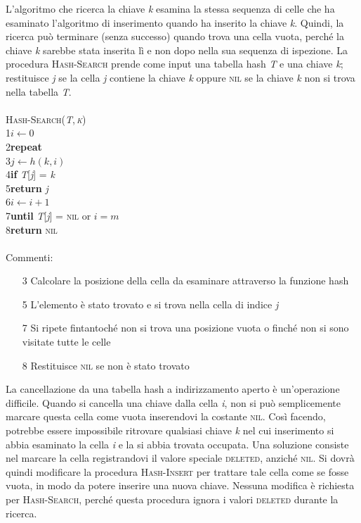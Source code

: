 \documentclass[10pt, a4paper]{report}
\newcommand\firsttab[1][0.5cm]{\hspace*{#1}}
\newcommand\secondtab[1][1cm]{\hspace*{#1}}
\newcommand\thirdtab[1][1.5cm]{\hspace*{#1}}
\begin{document}
L'algoritmo che ricerca la chiave \textit{k} esamina la stessa sequenza di celle che ha esaminato l'algoritmo di inserimento quando ha inserito la chiave \textit{k}. Quindi, la ricerca può terminare (senza successo) quando trova una cella vuota, perché la chiave \textit{k} sarebbe stata inserita lì e non dopo nella sua sequenza di ispezione. La procedura \textsc{Hash-Search} prende come input una tabella hash \textit{T} e una chiave \textit{k}; restituisce \textit{j} se la cella \textit{j} contiene la chiave \textit{k} oppure \textsc{nil} se la chiave \textit{k} non si trova nella tabella \textit{T}.\\\\
\textsc{Hash-Search(\textit{T},\,\textit{k})}\\
1\firsttab$i \leftarrow 0$\\
2\firsttab\textbf{repeat}\\
3\secondtab$j \leftarrow h(k,i)$\\
4\secondtab\textbf{if} \textit{T}[\textit{j}] = \textit{k}\\
5\thirdtab\textbf{return} \textit{j}\\
6\secondtab$i \leftarrow i + 1$\\
7\firsttab\textbf{until} \textit{T}[\textit{j}] = \textsc{nil} or $i = m$\\
8\firsttab\textbf{return} \textsc{nil} 
\\\\Commenti:
\begin{itemize}
\item[3]Calcolare la posizione della cella da esaminare attraverso la funzione hash
\item[5]L'elemento è stato trovato e si trova nella cella di indice \textit{j}
\item[7]Si ripete fintantoché non si trova una posizione vuota o finché non si sono visitate tutte le celle
\item[8]Restituisce \textsc{nil} se non è stato trovato
\end{itemize}

La cancellazione da una tabella hash a indirizzamento aperto è un'operazione difficile. Quando si cancella una chiave dalla cella \textit{i}, non si può semplicemente marcare questa cella come vuota inserendovi la costante \textsc{nil}. Così facendo, potrebbe essere impossibile ritrovare qualsiasi chiave \textit{k} nel cui inserimento si abbia esaminato la cella \textit{i} e la si abbia trovata occupata. Una soluzione consiste nel marcare la cella registrandovi il valore speciale \textsc{deleted}, anziché \textsc{nil}. Si dovrà quindi modificare la procedura \textsc{Hash-Insert} per trattare tale cella come se fosse vuota, in modo da potere inserire una nuova chiave. Nessuna modifica è richiesta per \textsc{Hash-Search}, perché questa procedura ignora i valori \textsc{deleted} durante la ricerca.\\
\end{document}
